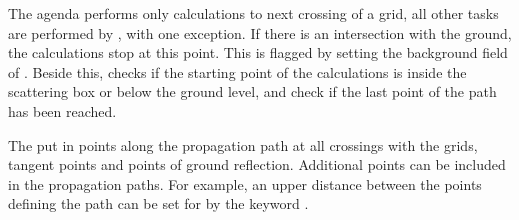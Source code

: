 The agenda performs only calculations to next crossing of a grid, all
other tasks are performed by , with one exception.
If there is an intersection with the ground, the calculations stop at
this point. This is flagged by setting the background field of
. Beside this,  checks if
the starting point of the calculations is inside the scattering box or
below the ground level, and check if the last point of the path has
been reached. 

The  put in points along the
propagation path at all crossings with the grids, tangent points and
points of ground reflection. Additional points can be included in the
propagation paths. For example, an upper distance between the points
defining the path can be set for  by
the keyword .



\label{sec:ppath:Ppath}

